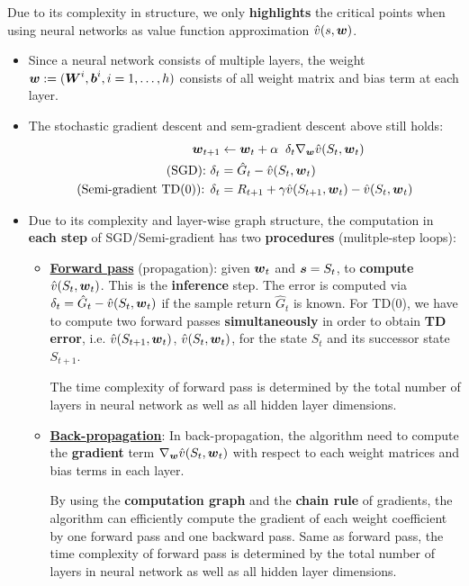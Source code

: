 \documentclass[11pt]{article}
\begin{document}
Due to its complexity in structure, we only \textbf{highlights} the critical points when using neural networks as value function approximation $\hat{v}(s, \boldsymbol{w})$.
\begin{itemize}
\item Since a neural network consists of multiple layers, the weight $\boldsymbol{w} := (\boldsymbol{W}^{i}, \boldsymbol{b}^{i}, i=1,\ldots, h)$ consists of all weight matrix and bias term at each layer. 

\item The stochastic gradient descent and sem-gradient descent above still holds:
\begin{align*}
\boldsymbol{w}_{t+1} &\leftarrow  \boldsymbol{w}_{t} + \alpha \;\;\delta_{t} \nabla_{\boldsymbol{w}}{\hat{v}(S_{t}, \boldsymbol{w}_{t})}\\
\text{(SGD): }\delta_{t}&=\hat{G}_{t} - \hat{v}(S_{t}, \boldsymbol{w}_{t}) \\
\text{(Semi-gradient TD(0)): }\delta_{t}&= R_{t+1} + \gamma \hat{v}(S_{t+1}, \boldsymbol{w}_{t}) - \hat{v}(S_{t}, \boldsymbol{w}_{t})
\end{align*}

\item Due to its complexity and layer-wise graph structure, the computation in \textbf{each step} of SGD/Semi-gradient has two \textbf{procedures} (mulitple-step loops):
\begin{itemize}
\item \underline{\textbf{Forward pass}} (propagation): given $\boldsymbol{w}_{t}$ and $\boldsymbol{s}=S_{t}$, to \textbf{compute} $\hat{v}(S_{t}, \boldsymbol{w}_{t})$. This is the \textbf{inference} step. The error is computed via $\delta_{t}=\hat{G}_{t} - \hat{v}(S_{t}, \boldsymbol{w}_{t})$ if the sample return $\hat{G}_{t}$ is known. For TD(0), we have to compute two forward passes \textbf{simultaneously} in order to obtain \textbf{TD error}, i.e. $ \hat{v}(S_{t+1}, \boldsymbol{w}_{t})$, $ \hat{v}(S_{t}, \boldsymbol{w}_{t})$, for the state $S_{t}$ and its successor state $S_{t+1}$.

The time complexity of forward pass is determined by the total number of layers in neural network as well as all hidden layer dimensions.  

\item \underline{\textbf{Back-propagation}}: In back-propagation, the algorithm need to compute the \textbf{gradient} term $\nabla_{\boldsymbol{w}}{\hat{v}(S_{t}, \boldsymbol{w}_{t})}$ with respect to each weight matrices and bias terms in each layer. 

By using the \textbf{computation graph} and the \textbf{chain rule} of gradients, the algorithm can efficiently compute the gradient of each weight coefficient by one forward pass and one backward pass. Same as forward pass, the time complexity of forward pass is determined by the total number of layers in neural network as well as all hidden layer dimensions.  
\end{itemize}



\end{itemize}
\end{document}
